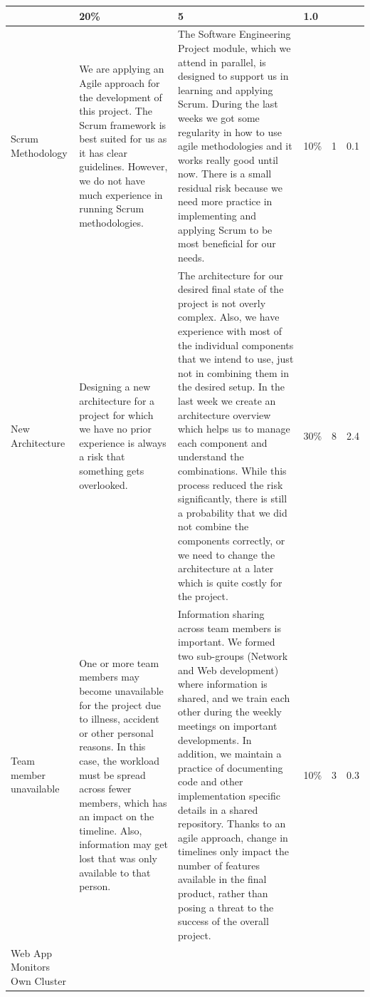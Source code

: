 \begin{longtable}[h!]{p{2.2cm} | p{4cm} | p{4cm} | p{1.5cm} | p{1.5cm} | p{1.5cm}}
            & 20\% & 5 & 1.0 \\ \hline
        Scrum Methodology 
            & We are applying an Agile approach for the development of this project. The Scrum framework is best suited for us as it has clear guidelines. However, we do not have much experience in running Scrum methodologies.
            & The Software Engineering Project module, which we attend in parallel, is designed to support us in learning and applying Scrum. During the last weeks we got some regularity in how to use agile methodologies and it works really good until now. There is a small residual risk because we need more practice in implementing and applying Scrum to be most beneficial for our needs.
            & 10\% & 1 & 0.1 \\ \hline
        New Architecture 
            & Designing a new architecture for a project for which we have no prior experience is always a risk that something gets overlooked.
            & The architecture for our desired final state of the project is not overly complex. Also, we have experience with most of the individual components that we intend to use, just not in combining them in the desired setup. In the last week we create an architecture overview which helps us to manage each component and understand the combinations. While this process reduced the risk significantly, there is still a probability that we did not combine the components correctly, or we need to change the architecture at a later which is quite costly for the project.
            & 30\% & 8 & 2.4 \\ \hline
        Team member unavailable
            & One or more team members may become unavailable for the project due to illness, accident or other personal reasons. In this case, the workload must be spread across fewer members, which has an impact on the timeline. Also, information may get lost that was only available to that person.
            & Information sharing across team members is important. We formed two sub-groups (Network and Web development) where information is shared, and we train each other during the weekly meetings on important developments. In addition, we maintain a practice of documenting code and other implementation specific details in a shared repository. Thanks to an agile approach, change in timelines only impact the number of features available in the final product, rather than posing a threat to the success of the overall project.
            & 10\% & 3 & 0.3 \\ \hline
        Web App Monitors Own Cluster

\end{longtable}
